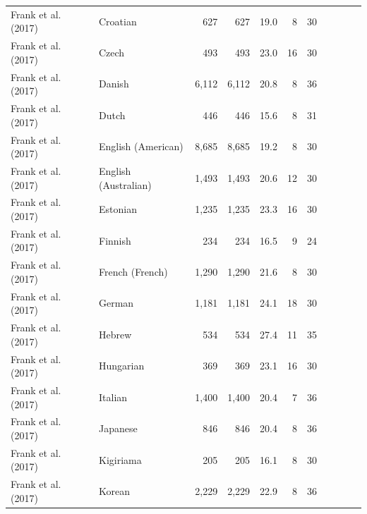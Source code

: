 \documentclass[
  11pt,
]{article}
\begin{document}
\begin{landscape}
\begin{longtable}[t]{llrrrrrclrr}
\hspace{1em}Frank et al. (2017) & Croatian & 627 & 627 & 19.0 & 8 & 30 &  &  &  & \\
\hspace{1em}Frank et al. (2017) & Czech & 493 & 493 & 23.0 & 16 & 30 &  &  &  & \\
\hspace{1em}Frank et al. (2017) & Danish & 6,112 & 6,112 & 20.8 & 8 & 36 &  &  &  & \\
\hspace{1em}Frank et al. (2017) & Dutch & 446 & 446 & 15.6 & 8 & 31 &  &  &  & \\
\hspace{1em}Frank et al. (2017) & English (American) & 8,685 & 8,685 & 19.2 & 8 & 30 &  &  &  & \\
\hspace{1em}Frank et al. (2017) & English (Australian) & 1,493 & 1,493 & 20.6 & 12 & 30 &  &  &  & \\
\hspace{1em}Frank et al. (2017) & Estonian & 1,235 & 1,235 & 23.3 & 16 & 30 &  &  &  & \\
\hspace{1em}Frank et al. (2017) & Finnish & 234 & 234 & 16.5 & 9 & 24 &  &  &  & \\
\hspace{1em}Frank et al. (2017) & French (French) & 1,290 & 1,290 & 21.6 & 8 & 30 &  &  &  & \\
\hspace{1em}Frank et al. (2017) & German & 1,181 & 1,181 & 24.1 & 18 & 30 &  &  &  & \\
\hspace{1em}Frank et al. (2017) & Hebrew & 534 & 534 & 27.4 & 11 & 35 &  &  &  & \\
\hspace{1em}Frank et al. (2017) & Hungarian & 369 & 369 & 23.1 & 16 & 30 &  &  &  & \\
\hspace{1em}Frank et al. (2017) & Italian & 1,400 & 1,400 & 20.4 & 7 & 36 &  &  &  & \\
\hspace{1em}Frank et al. (2017) & Japanese & 846 & 846 & 20.4 & 8 & 36 &  &  &  & \\
\hspace{1em}Frank et al. (2017) & Kigiriama & 205 & 205 & 16.1 & 8 & 30 &  &  &  & \\
\hspace{1em}Frank et al. (2017) & Korean & 2,229 & 2,229 & 22.9 & 8 & 36 &  &  &  & \\

\end{longtable}
\end{landscape}
\end{document}
